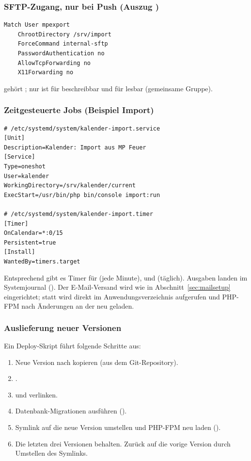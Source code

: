 \subsubsection*{SFTP-Zugang, nur bei Push (Auszug )}

\begin{lstlisting}
Match User mpexport
    ChrootDirectory /srv/import
    ForceCommand internal-sftp
    PasswordAuthentication no
    AllowTcpForwarding no
    X11Forwarding no
\end{lstlisting}

 gehört ; nur  ist für
 beschreibbar und für  lesbar (gemeinsame
Gruppe).

\subsubsection*{Zeitgesteuerte Jobs (Beispiel Import)}

\begin{lstlisting}
# /etc/systemd/system/kalender-import.service
[Unit]
Description=Kalender: Import aus MP Feuer
[Service]
Type=oneshot
User=kalender
WorkingDirectory=/srv/kalender/current
ExecStart=/usr/bin/php bin/console import:run

# /etc/systemd/system/kalender-import.timer
[Timer]
OnCalendar=*:0/15
Persistent=true
[Install]
WantedBy=timers.target
\end{lstlisting}

Entsprechend gibt es Timer für  (jede Minute),
 und  (täglich). Ausgaben landen im
Systemjournal (). Der E-Mail-Versand
wird wie in Abschnitt~\ref{sec:mailsetup} eingerichtet; statt
 wird 
direkt im Anwendungsverzeichnis aufgerufen und PHP-FPM nach Änderungen an
der  neu geladen.

\subsubsection*{Auslieferung neuer Versionen}

Ein Deploy-Skript führt folgende Schritte aus:

\begin{enumerate}
  \item Neue Version nach  kopieren (aus dem
        Git-Repository).
  \item {}.
  \item {} und  verlinken.
  \item Datenbank-Migrationen ausführen
        ().
  \item Symlink  auf die neue Version umstellen und
        PHP-FPM neu laden ().
  \item Die letzten drei Versionen behalten. Zurück auf die vorige Version
        durch Umstellen des Symlinks.
\end{enumerate}

